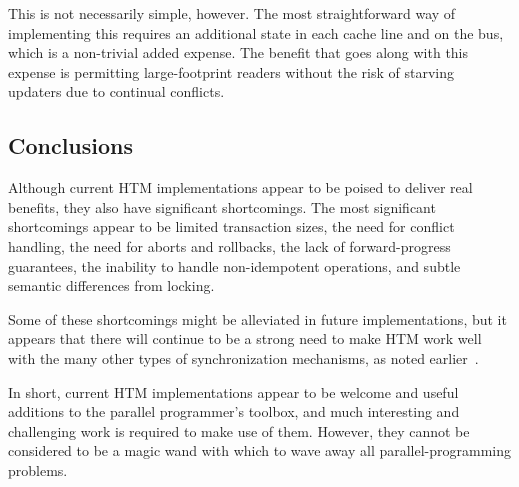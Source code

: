 This is not necessarily simple, however.
The most straightforward way of implementing this requires an additional
state in each cache line and on the bus, which is a non-trivial added
expense.
The benefit that goes along with this expense is permitting
large-footprint readers without the risk of starving updaters due
to continual conflicts.

\subsection{Conclusions}
\label{sec:future:Conclusions}

Although current HTM implementations appear to be poised to deliver real
benefits, they also have significant shortcomings.
The most significant shortcomings appear to be
limited transaction sizes,
the need for conflict handling, the need for aborts and rollbacks,
the lack of forward-progress guarantees,
the inability to handle non-idempotent operations,
and subtle semantic differences
from locking.

Some of these shortcomings might be alleviated in future implementations,
but it appears that there will continue to be a strong need to make
HTM work well with the many other types of synchronization mechanisms,
as noted earlier~\cite{McKenney2007PLOSTM,PaulEMcKenney2010OSRGrassGreener}.

In short, current HTM implementations appear to be welcome and useful
additions to the parallel programmer's toolbox, and much interesting
and challenging work is required to make use of them.
However, they cannot be
considered to be a magic wand with which to wave away all parallel-programming
problems.
